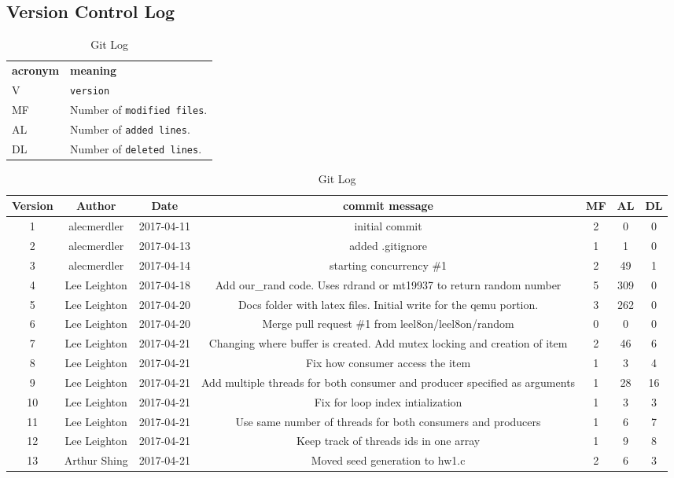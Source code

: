 \documentclass[journal, letterpaper, draftclsnofoot, onecolumn, 10pt]{IEEEtran}
\begin{document}
\subsection{Version Control Log}
\FloatBarrier
\begin{table}
    \begin{tabular}{lp{12cm}}
      \label{tabular:legend:git-log}
      \textbf{acronym} & \textbf{meaning} \\
      V & \texttt{version} \\
      MF & Number of \texttt{modified files}. \\
      AL & Number of \texttt{added lines}. \\
      DL & Number of \texttt{deleted lines}. \\
    \end{tabular}
\centering
\caption{Git Log}
\begin{tabular}{|c|c|c|c|c|c|c|}
    \hline \textbf{Version} & \textbf{Author} & \textbf{Date} & \textbf{commit message} & \textbf{MF} & \textbf{AL} & \textbf{DL}  \\
    \hline 1 & alecmerdler & 2017-04-11 & initial commit & 2 & 0 & 0 \\
    \hline 2 & alecmerdler & 2017-04-13 & added .gitignore & 1 & 1 & 0 \\
    \hline 3 & alecmerdler & 2017-04-14 & starting concurrency \#1 & 2 & 49 & 1 \\
    \hline 4 & Lee Leighton & 2017-04-18 & Add our\_rand code. Uses rdrand or mt19937 to return random number & 5 & 309 & 0 \\
    \hline 5 & Lee Leighton & 2017-04-20 & Docs folder with latex files. Initial write for the qemu portion. & 3 & 262 & 0 \\
    \hline 6 & Lee Leighton & 2017-04-20 & Merge pull request \#1 from leel8on/leel8on/random & 0 & 0 & 0 \\
    \hline 7 & Lee Leighton & 2017-04-21 & Changing where buffer is created. Add mutex locking and creation of item & 2 & 46 & 6 \\
    \hline 8 & Lee Leighton & 2017-04-21 & Fix how consumer access the item & 1 & 3 & 4 \\
    \hline 9 & Lee Leighton & 2017-04-21 & Add multiple threads for both consumer and producer specified as arguments & 1 & 28 & 16 \\
    \hline 10 & Lee Leighton & 2017-04-21 & Fix for loop index intialization & 1 & 3 & 3 \\
    \hline 11 & Lee Leighton & 2017-04-21 & Use same number of threads for both consumers and producers & 1 & 6 & 7 \\
    \hline 12 & Lee Leighton & 2017-04-21 & Keep track of threads ids in one array & 1 & 9 & 8 \\
    \hline 13 & Arthur Shing & 2017-04-21 & Moved seed generation to hw1.c & 2 & 6 & 3 \\
    \hline
\end{tabular}
\end{table}
\FloatBarrier
\end{document}
